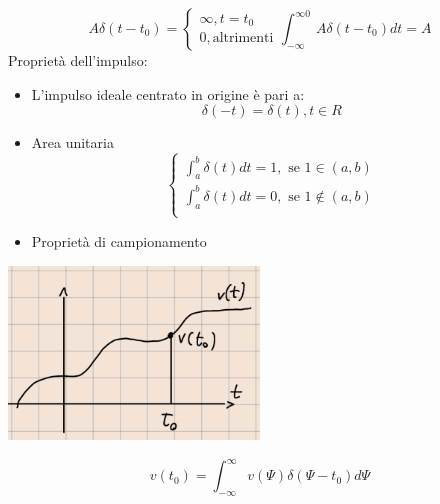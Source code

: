 \documentclass[a4paper, 12pt]{book}
\theoremstyle{plain}
\begin{document}
\[
    A\delta(t - t_0) = \begin{cases}
        \infty, t = t_0\\
        0, \textrm{altrimenti}
    \end{cases}    
    \int_{-\infty}^{\infty0} A\delta(t - t_0) dt = A
\]
Proprietà dell'impulso:
\begin{itemize}
    \item L'impulso ideale centrato in origine è pari a: \[\delta(-t) = \delta(t), t \in R\]
    \item Area unitaria \[\begin{cases}
        \int_a^b \delta(t)dt = 1, \textrm{ se } 1 \in (a, b)\\
        \int_a^b \delta(t)dt = 0, \textrm{ se } 1 \notin (a, b)\\
    \end{cases}\]
    \item Proprietà di campionamento
\end{itemize}

\begin{center}
    \includegraphics[width=0.5\textwidth]{campionamento.png}
\end{center}

\[
    v(t_0) = \int_{-\infty}^\infty v(\Psi) \delta(\Psi - t_0) d\Psi    
\]
\end{document}
